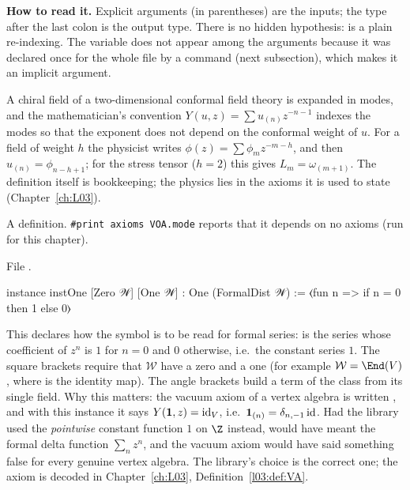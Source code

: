 \begin{dictionary}
\textbf{How to read it.} Explicit arguments (in parentheses) are the inputs; the type after the last
colon is the output type. There is no hidden hypothesis:  is a plain re-indexing. The
variable  does not appear among the arguments because it was declared once for the whole
file by a  command (next subsection), which makes it an implicit argument.
\end{dictionary}

\begin{physics}
A chiral field of a two-dimensional conformal field theory is expanded in modes, and the
mathematician's convention $Y(u,z) = \sum u_{(n)}z^{-n-1}$ indexes the modes so that the exponent
does not depend on the conformal weight of $u$. For a field of weight $h$ the physicist writes
$\phi(z) = \sum\phi_m z^{-m-h}$, and then $u_{(n)} = \phi_{n-h+1}$; for the stress tensor ($h=2$)
this gives $L_m = \omega_{(m+1)}$. The definition itself is bookkeeping; the physics lies in the
axioms it is used to state (Chapter~\ref{ch:L03}).
\end{physics}

\begin{status}
A definition. \texttt{\#print axioms VOA.mode} reports that it depends on no axioms (run for this
chapter).
\end{status}

\begin{example}\label{ch01:ex:instOne}
\noindent File .
\begin{leancode}
instance instOne [Zero 𝒲] [One 𝒲] : One (FormalDist 𝒲) := ⟨fun n => if n = 0 then 1 else 0⟩
\end{leancode}
This declares how the symbol  is to be read for formal series:  is the series whose
coefficient of $z^n$ is $1$ for $n=0$ and $0$ otherwise, i.e.\ the constant series $1$. The square
brackets \lean{[Zero 𝒲] [One 𝒲]} require that $\mathcal W$ have a zero and a one (for example
$\mathcal W = \End(V)$, where  is the identity map). The angle brackets
 build a term of the class  from its single field. Why this matters: the vacuum
axiom of a vertex algebra is written , and with this instance it says
$Y(\mathbf{1},z) = \mathrm{id}_V$, i.e.\ $\mathbf{1}_{(n)} = \delta_{n,-1}\,\mathrm{id}$. Had the
library used the \emph{pointwise} constant function $1$ on $\Z$ instead,  would have meant
the formal delta function $\sum_n z^n$, and the vacuum axiom would have said something false for
every genuine vertex algebra. The library's choice is the correct one; the axiom is decoded in
Chapter~\ref{ch:L03}, Definition~\ref{l03:def:VA}.
\end{example}


